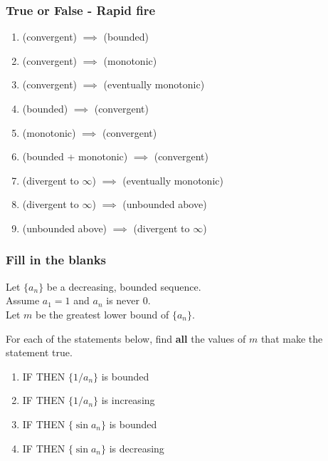 \documentclass[14pt]{beamer}
\begin{document}
\begin{frame}[t]
	\frametitle{True or False - Rapid fire}

	\begin{enumerate}
		\item (convergent) $\displaystyle \implies$ (bounded)
			\vfill

		\item (convergent) $\displaystyle \implies$ (monotonic)
			\vfill

		\item (convergent) $\displaystyle \implies$ (eventually monotonic)
			\vfill

		\item (bounded) $\displaystyle \implies$ (convergent)
			\vfill

		\item (monotonic) $\displaystyle \implies$ (convergent)
			\vfill

		\item (bounded + monotonic) $\displaystyle \implies$ (convergent)
			\vfill

		\item (divergent to $\infty$) $\displaystyle \implies$ (eventually monotonic)
			\vfill

		\item (divergent to $\infty$) $\displaystyle \implies$ (unbounded above)
			\vfill

		\item (unbounded above) $\displaystyle \implies$ (divergent to $\infty$)
	\end{enumerate}
	\vfill

	\vfill
\end{frame}

\begin{frame}[t]
	\fontsize{13}{13}\selectfont
	\frametitle{Fill in the blanks}

	Let $\displaystyle \{a_{n}\}$ be a decreasing, bounded sequence. \\ Assume $a_{1}
	= 1$ and $a_{n}$ is never $0$. \\ Let $m$ be the greatest lower bound of
	$\displaystyle \{a_{n}\}$.\\
	\medskip

	For each of the statements below, find \textbf{all} the values of $m$ that make
	the statement true.

	\begin{enumerate}
		\item IF \boxed{\phantom{????????????}} THEN $\displaystyle \{1/a_{n}\}$ is
			bounded

		\item IF \boxed{\phantom{????????????}} THEN $\displaystyle \{1/a_{n}\}$ is
			increasing

		\item IF \boxed{\phantom{????????????}} THEN $\displaystyle \{\sin a_{n}\}$
			is bounded

		\item IF \boxed{\phantom{????????????}} THEN $\displaystyle \{\sin a_{n}\}$
			is decreasing
	\end{enumerate}
\end{frame}
\end{document}
